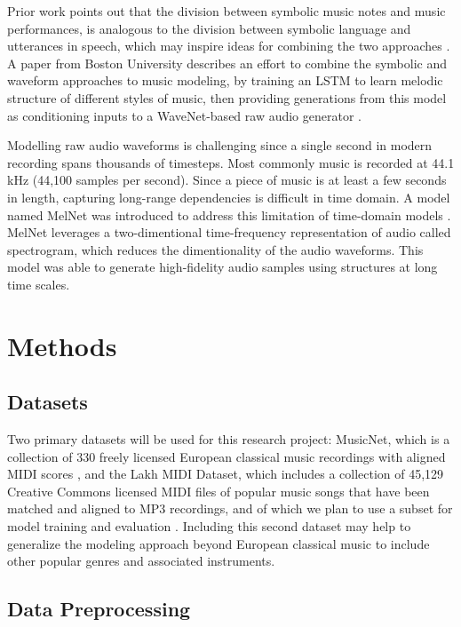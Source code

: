 \documentclass[sigconf,authorversion]{acmart}
\begin{document}
Prior work points out that the division between symbolic music notes
and music performances, is analogous to the division between symbolic
language and utterances in speech, which may inspire ideas for
combining the two approaches \cite{hawthorne2019enabling}. A paper
from Boston University describes an effort to combine the symbolic and
waveform approaches to music modeling, by training an LSTM to learn
melodic structure of different styles of music, then providing
generations from this model as conditioning inputs to a WaveNet-based
raw audio generator \cite{manzelli_conditioning_2018}.

Modelling raw audio waveforms is challenging since a single second in
modern recording spans thousands of timesteps. Most commonly music is
recorded at 44.1 kHz (44,100 samples per second). Since a piece of music
is at least a few seconds in length, capturing long-range dependencies
is difficult in time domain. A model named MelNet was introduced to address
this limitation of time-domain models \cite{vasquez2019melnet}. MelNet 
leverages a two-dimentional time-frequency representation of audio called 
spectrogram, which reduces the dimentionality of the audio waveforms. This 
model was able to generate high-fidelity audio samples using structures at 
long time scales.

\section{Methods}

\subsection{Datasets}

Two primary datasets will be used for this research project: MusicNet,
which is a collection of 330 freely licensed European classical music
recordings with aligned MIDI scores \cite{thickstun2017learning}, and
the Lakh MIDI Dataset, which includes a collection of 45,129 Creative
Commons licensed MIDI files of popular music songs that have been
matched and aligned to MP3 recordings, and of which we plan to use a
subset for model training and evaluation
\cite{raffel_learning-based_2016}. Including this second dataset may
help to generalize the modeling approach beyond European classical
music to include other popular genres and associated instruments.


\subsection{Data Preprocessing}
\end{document}

